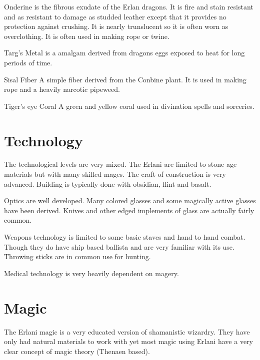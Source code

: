 \begin{relate}
        \item[Onderine]
        is the fibrous exudate of the Erlan dragons. It is fire and stain
        resistant and as resistant to damage as studded leather except that
        it provides no protection against crushing. It is nearly trunslucent
        so it is often worn as overclothing. It is often used in making rope
        or twine.

        \item[Targ's Metal]
        is a amalgam derived from dragons eggs exposed to heat for long
        periods of time.

		\item[Sisal Fiber] A simple fiber derived from the Conbine plant. 
		It is used in making rope and a heavily narcotic pipeweed.

		\item[Tiger's eye Coral] A green and yellow coral used in divination
        spells and sorceries.

\end{relate}

\section{Technology}

The technological levels are very mixed. The Erlani are limited to
stone age materials but with many skilled mages. The craft of construction
is very advanced. Building is typically done with obsidian, flint and basalt. 

Optics are well developed. Many colored glasses and some magically active glasses
have been derived. Knives and other edged implements of glass are actually 
fairly common.

Weapons technology is limited to
some basic staves and hand to hand combat. Though they do have ship based ballista
and are very familiar with its use. Throwing sticks are in common use for hunting.

Medical technology is very heavily dependent on magery. 

\section{Magic}

The Erlani magic is a very educated version of shamanistic wizardry. They
have only had natural materials to work with yet most magic using Erlani
have a very clear concept of magic theory (Thenaen based).

